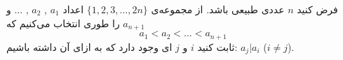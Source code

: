 \documentclass[12pt,onecolumn,a4paper]{article}
\begin{document}
    

 
        فرض کنید
        $n$
        عددی طبیعی باشد. از مجموعه‌ی
        $\{ 1,2,3,...,2n \} $
        اعداد
        $a_1$
        ,
        $a_2$
        , ...
        و
        $a_{n+1}$
        را طوری انتخاب می‌کنیم که
        $$a_1<a_2<...<a_{n+1}$$
        ثابت کنید
        $i$
        و
        $j$
        ای
        وجود دارد که به ازای آن داشته باشیم:
        $a_j|a_i$
        ($i\neq j$).
        			
        
    
\end{document}

